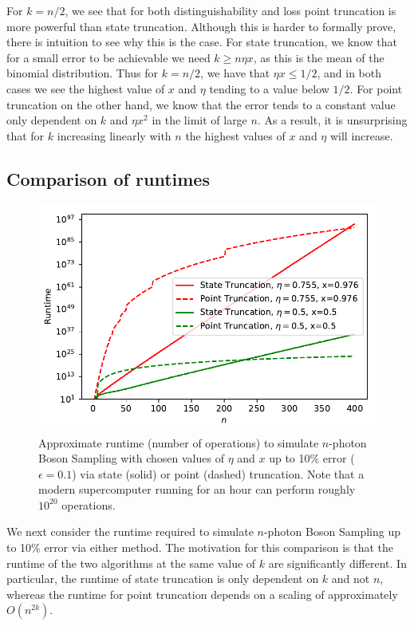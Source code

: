 For $k=n/2$, we see that for both distinguishability and loss point truncation is more powerful than state truncation. 
Although this is harder to formally prove, there is intuition to see why this is the case. 
For state truncation, we know that for a small error to be achievable we need $k\geq n\eta x$, as this is the mean of the binomial distribution. 
Thus for $k=n/2$, we have that $\eta x \leq 1/2$, and in both cases we see the highest value of $x$ and $\eta$ tending to a value below $1/2$. 
For point truncation on the other hand, we know that the error tends to a constant value only dependent on $k$ and $\eta x^2$ in the limit of large $n$. 
As a result, it is unsurprising that for $k$ increasing linearly with $n$ the highest values of $x$ and $\eta$ will increase.


\subsection{Comparison of runtimes}
\label{subsec:runtimes}

\begin{figure}
\includegraphics[width=\linewidth]{classical_sim/runtime}
\caption[Approximate runtime to simulate $n$-photon Boson Sampling with chosen values of $\eta$ and $x$ via state or point truncation]{\label{fig:runtime} Approximate runtime (number of operations) to simulate $n$-photon Boson Sampling with chosen values of $\eta$ and $x$ up to 10\% error ($\epsilon=0.1$) via state (solid) or point (dashed) truncation. Note that a modern supercomputer running for an hour can perform roughly $10^{20}$ operations.}
\end{figure}

We next consider the runtime required to simulate $n$-photon Boson Sampling up to 10\% error via either method. 
The motivation for this comparison is that the runtime of the two algorithms at the same value of $k$ are significantly different. 
In particular, the runtime of state truncation is only dependent on $k$ and not $n$, whereas the runtime for point truncation depends on a scaling of approximately $O(n^{2k})$.

